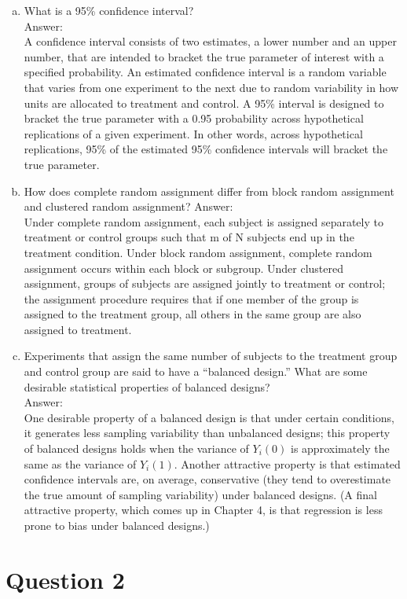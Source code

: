 \documentclass[11pt,notitlepage]{article}\usepackage[]{graphicx}\usepackage[]{color}
\makeatletter
\newenvironment{kframe}{%
 \def\at@end@of@kframe{}%
 \ifinner\ifhmode%
  \def\at@end@of@kframe{\end{minipage}}%
  \begin{minipage}{\columnwidth}%
 \fi\fi%
 \def\FrameCommand##1{\hskip\@totalleftmargin \hskip-\fboxsep
 \colorbox{shadecolor}{##1}\hskip-\fboxsep
     \hskip-\linewidth \hskip-\@totalleftmargin \hskip\columnwidth}%
 \MakeFramed {\advance\hsize-\width
   \@totalleftmargin\z@ \linewidth\hsize
   \@setminipage}}%
 {\par\unskip\endMakeFramed%
 \at@end@of@kframe}
\newenvironment{knitrout}{}{} %
\makeatother
\begin{document}
\begin{enumerate}[a)]
\item What is a 95\% confidence interval?  \\
Answer:\\ 
A confidence interval consists of two estimates, a lower number and an upper number, that are intended to bracket the true parameter of interest with a specified probability. An estimated confidence interval is a random variable that varies from one experiment to the next due to random variability in how units are allocated to treatment and control. A 95\% interval is designed to bracket the true parameter with a 0.95 probability across hypothetical replications of a given experiment.  In other words, across hypothetical replications, 95\% of the estimated 95\% confidence intervals will bracket the true parameter.  
\item How does complete random assignment differ from block random assignment and clustered random assignment?
Answer:\\
Under complete random assignment, each subject is assigned separately to treatment or control groups such that m of N subjects end up in the treatment condition. Under block random assignment, complete random assignment occurs within each block or subgroup. Under clustered assignment, groups of subjects are assigned jointly to treatment or control; the assignment procedure requires that if one member of the group is assigned to the treatment group, all others in the same group are also assigned to treatment. 
\item Experiments that assign the same number of subjects to the treatment group and control group are said to have a ``balanced design.''  What are some desirable statistical properties of balanced designs?\\
Answer:\\
One desirable property of a balanced design is that under certain conditions, it generates less sampling variability than unbalanced designs; this property of balanced designs holds when the variance of $Y_i(0)$ is approximately the same as the variance of $Y_i (1)$. Another attractive property is that estimated confidence intervals are, on average, conservative (they tend to overestimate the true amount of sampling variability) under balanced designs. (A final attractive property, which comes up in Chapter 4, is that regression is less prone to bias under balanced designs.)
\end{enumerate}

\section*{Question 2}
\begin{knitrout}
\color{fgcolor}\begin{kframe}
\begin{verbatim}








\end{verbatim}
\end{kframe}
\end{knitrout}
\end{document}

